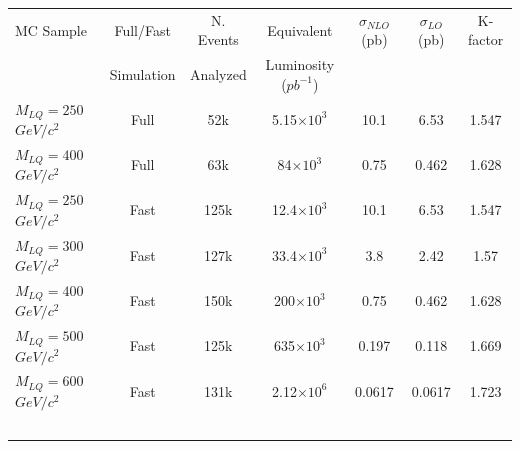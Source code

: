\documentclass{cmspaper}
\begin{document}
\begin{linenumbers}
\begin{table}[htb]
  \label{tab:NumEvents}
  \begin{center}
    \begin{tabular}{|l|cccccc|} \hline\hline
      MC Sample                   & Full/Fast & N. Events & Equivalent             & $\sigma_{NLO}$ (pb) & $\sigma_{LO}$ (pb) & K-factor \\
                                  & Simulation& Analyzed  & Luminosity ($pb^{-1}$)        &                     &                    &    \\ 
\hline\hline
      $M_{LQ}=250~$$GeV/c^2$            & Full      & 52k       &    5.15$\times 10^3$   & 10.1                & 6.53               & 1.547\\
      $M_{LQ}=400~$$GeV/c^2$            & Full      & 63k       &      84$\times 10^3$   &  0.75		 & 0.462	      & 1.628\\ 
\hline
      $M_{LQ}=250~$$GeV/c^2$            & Fast      & 125k      &    12.4$\times 10^3$   & 10.1		 & 6.53		      & 1.547\\
      $M_{LQ}=300~$$GeV/c^2$            & Fast      & 127k      &    33.4$\times 10^3$   &  3.8	         & 2.42		      & 1.57\\
      $M_{LQ}=400~$$GeV/c^2$            & Fast      & 150k      &     200$\times 10^3$   &  0.75	         & 0.462	      & 1.628\\
      $M_{LQ}=500~$$GeV/c^2$            & Fast      & 125k      &     635$\times 10^3$   &  0.197  	         & 0.118	      & 1.669\\
      $M_{LQ}=600~$$GeV/c^2$            & Fast      & 131k      &    2.12$\times 10^6$   &  0.0617             & 0.0617             & 1.723\\
$$
\end{tabular}
\end{center}
\end{table}
\end{linenumbers}
\end{document}
